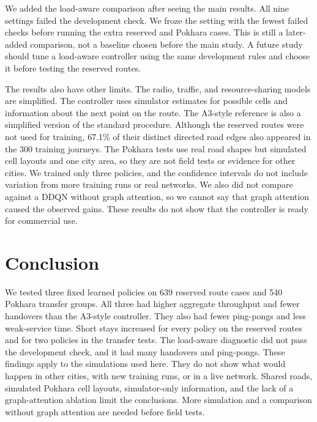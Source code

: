 \documentclass[fleqn,10pt,twoside]{IOEGC}
\begin{document}
We added the load-aware comparison after seeing the main results. All nine settings failed the development check. We froze the setting with the fewest failed checks before running the extra reserved and Pokhara cases. This is still a later-added comparison, not a baseline chosen before the main study. A future study should tune a load-aware controller using the same development rules and choose it before testing the reserved routes.

The results also have other limits. The radio, traffic, and resource-sharing models are simplified. The controller uses simulator estimates for possible cells and information about the next point on the route. The A3-style reference is also a simplified version of the standard procedure. Although the reserved routes were not used for training, 67.1\% of their distinct directed road edges also appeared in the 300 training journeys. The Pokhara tests use real road shapes but simulated cell layouts and one city area, so they are not field tests or evidence for other cities. We trained only three policies, and the confidence intervals do not include variation from more training runs or real networks. We also did not compare against a DDQN without graph attention, so we cannot say that graph attention caused the observed gains. These results do not show that the controller is ready for commercial use.

\section{Conclusion}
We tested three fixed learned policies on 639 reserved route cases and 540 Pokhara transfer groups. All three had higher aggregate throughput and fewer handovers than the A3-style controller. They also had fewer ping-pongs and less weak-service time. Short stays increased for every policy on the reserved routes and for two policies in the transfer tests. The load-aware diagnostic did not pass the development check, and it had many handovers and ping-pongs. These findings apply to the simulations used here. They do not show what would happen in other cities, with new training runs, or in a live network. Shared roads, simulated Pokhara cell layouts, simulator-only information, and the lack of a graph-attention ablation limit the conclusions. More simulation and a comparison without graph attention are needed before field tests.

\end{document}

